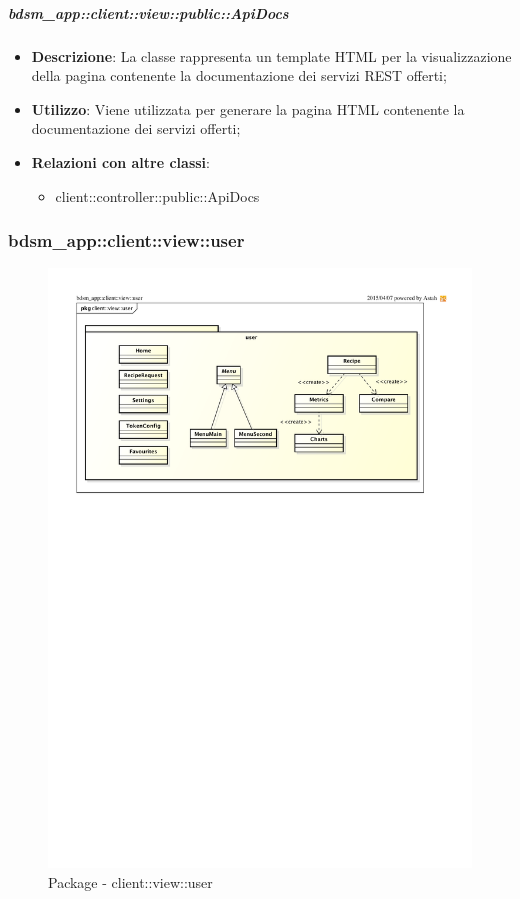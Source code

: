 		\subparagraph{bdsm\_app::client::view::public::ApiDocs} %
		\label{subp:bdsm_app_client_view_public_apidocs}
			\begin{itemize}
				\item \textbf{Descrizione}: La classe rappresenta un template HTML per la visualizzazione della pagina contenente la documentazione dei servizi REST offerti;
				\item \textbf{Utilizzo}: Viene utilizzata per generare la pagina HTML contenente la documentazione dei servizi offerti;
				\item \textbf{Relazioni con altre classi}: 		
					\begin{itemize}
						\item client::controller::public::ApiDocs
					\end{itemize}
			\end{itemize}



\subsubsection{bdsm\_app::client::view::user} %
\label{ssub:bdsm_app_client_view_user}
\begin{figure}[htbp]
	\centering
	\centerline{\includegraphics[scale=1.05]{./images/client_view_user.pdf}}
	\caption{Package - client::view::user}
\end{figure}

